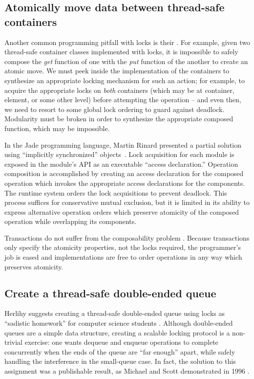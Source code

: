 
\subsection{Atomically move data between thread-safe containers}
Another common programming pitfall with locks is their
.
For example, given two thread-safe
container classes implemented with locks, it is impossible to
safely compose
the \textit{get} function of one with the \textit{put} function of
the another to create an atomic move.  We must peek inside the
implementation of the containers to synthesize an appropriate locking
mechanism for such an action; for example, to acquire the appropriate
locks on \emph{both} containers (which may be at container, element,
or some other level) before attempting the operation -- and even then,
we need to resort to some global lock ordering to guard against
deadlock.  Modularity must be broken in order to synthesize the
appropriate composed function, which may be impossible.

In the Jade programming language, Martin Rinard presented a partial
solution using ``implicitly synchronized'' objects~\cite[p14]{Rinard98}.
Lock acquisition
for each module is exposed in the module's API as an executable
``access declaration.''  Operation composition is accomplished by
creating an access declaration for the composed operation which
invokes the appropriate access declarations for the components.  The
runtime system orders the lock acquisitions to prevent deadlock.  This
process suffices for conservative mutual exclusion, but it is limited in its
ability to express alternative operation orders which preserve
atomicity of the composed operation while overlapping its components.

Transactions do not suffer from the composability problem
\cite{HarrisMaPeHe05}.  Because transactions only specify the atomicity
properties, not the locks required, the programmer's job is eased and
implementations are free to order operations in any way which
preserves atomicity.

\subsection{Create a thread-safe double-ended queue}
Herlihy suggests creating a thread-safe double-ended queue using locks
as ``sadistic homework'' for computer science students \cite{Herlihy05}.
Although double-ended queues are a simple data structure,
creating a scalable locking protocol is a
non-trivial exercise: one wants dequeue and enqueue operations to
complete concurrently when the ends of the queue are ``far enough''
apart, while safely handling the interference in the small-queue case.
In fact, the solution to this assignment was a publishable result, as
Michael and Scott demonstrated in 1996 \cite{MichaelSc96}.

